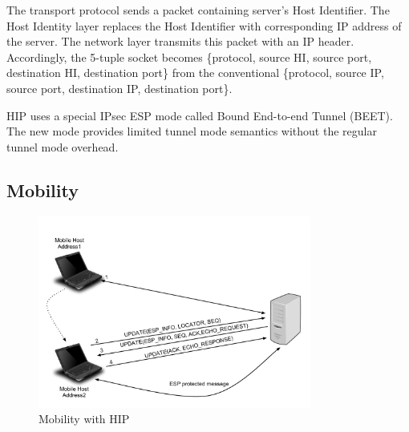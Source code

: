 The transport protocol sends a packet containing server's Host Identifier. The Host Identity layer replaces the Host Identifier with corresponding IP address of the server. The network layer transmits this packet with an IP header. Accordingly, the 5-tuple socket becomes \{protocol, source HI, source port, destination HI, destination port\} from the conventional \{protocol, source IP, source port, destination IP, destination port\}. 

HIP uses a special IPsec ESP mode called Bound End-to-end Tunnel (BEET). The new mode provides limited tunnel mode semantics without the regular tunnel mode overhead.

\subsection{Mobility}
\begin{figure}[htb!]
\centering
\includegraphics[width=0.8\textwidth]{images/HIP_figure4}
\caption{Mobility with HIP}
\label{fig:HIP_mob}
\end{figure}


